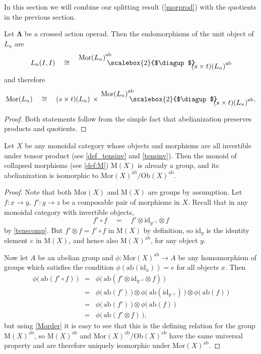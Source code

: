 \documentclass{amsbook} %
\newcommand{\id}{\textrm{id}}
\newcommand{\ML}{\mathbf{\Lambda}}
\newcommand{\MorLn}{\mathrm{Mor}(L_n)}
\newcommand{\bigquotient}[2]{ \raisebox{0.75\height}{$#1$} \mkern-12mu\scalebox{2}{$\diagup$}\mkern-10mu \raisebox{-0.5\height}{$#2$} }
\numberwithin{section}{chapter}
\begin{document}
In this section we will combine our splitting result (\cref{morprod}) with the quotients in the previous section.

\begin{cor}\label{Zmor1} Let $\ML$ be a crossed action operad. Then the endomorphisms of the unit object of $L_n$ are
\[ L_n(I, I) \quad \cong \quad \bigquotient{{\MorLn}^{\mathrm{ab}}}{{(s \times t)(L_n)}^{\mathrm{ab}}} \]
and therefore
\[ \MorLn \quad \cong \quad (s \times t)(L_n) \, \times \, \bigquotient{{\MorLn}^{\mathrm{ab}}}{{(s \times t)(L_n)}^{\mathrm{ab}}}. \]
\end{cor}
\begin{proof}
Both statements follow from the simple fact that abelianization preserves products and quotients.
\end{proof}

\begin{lem} \label{colquot} Let $X$ be any monoidal category whose objects and morphisms are all invertible under tensor product (see \cref{def_tensinv} and \cref{tensinv}). Then the monoid of collapsed morphisms (see \cref{def:M}) $\mathrm{M}(X)$ is already a group, and its abelianization is isomorphic to $\mathrm{Mor}(X)^{\mathrm{ab}}/ \mathrm{Ob}(X)^{\mathrm{ab}}$.
\end{lem}
\begin{proof}
Note that both $\mathrm{Mor}(X)$ and $\mathrm{M}(X)$ are groups by assumption. Let  $f \colon  x \to y$, $f' \colon  y \to z$ be a composable pair of morphisms in $X$. Recall  that in any monoidal category with invertible objects,
\[ f' \circ f \quad = \quad f' \otimes \id_{y^{-1}} \otimes f \]
by \cref{tenscomp}.  But $f' \otimes f = f' \circ f$ in $\mathrm{M}(X)$ by definition, so $\id_y$ is the identity element $e$ in $\mathrm{M}(X)$, and hence also $\mathrm{M}(X)^{\mathrm{ab}}$, for any object $y$.

Now let $A$ be an abelian group and $\phi \colon  \mathrm{Mor}(X)^{\mathrm{ab}} \to A$ be any homomorphism of groups which satisfies the condition $\phi(\mathrm{ab}(\id_x)) = e$ for all objects $x$. Then
\[ \begin{array}{rll}
			\phi\big( \, \mathrm{ab}(f' \circ f) \, \big)  & = & \phi\big( \, \mathrm{ab}(f' \otimes \id_{y^{-1}} \otimes f) \, \big) \\
			& = & \phi\big( \, \mathrm{ab}(f') \, \big) \otimes \phi\big( \, \mathrm{ab}(\id_{y^{-1}}) \, \big) \otimes \phi\big( \, \mathrm{ab}(f) \, \big) \\
			& = & \phi\big( \, \mathrm{ab}(f') \, \big) \otimes \phi\big( \, \mathrm{ab}(f) \, \big) \\
			& = & \phi\big( \, \mathrm{ab}(f' \otimes f) \, \big),
		\end{array}
\]
but using \cref{Morder} it is easy to see that this is the defining relation for the group $\mathrm{M}(X)^{\mathrm{ab}}$, so $\mathrm{M}(X)^{\mathrm{ab}}$ and $\mathrm{Mor}(X)^{\mathrm{ab}}/\mathrm{Ob}(X)^{\mathrm{ab}}$ have the same universal property and are therefore uniquely isomorphic under $\mathrm{Mor}(X)^{\mathrm{ab}}$.
\end{proof}
\end{document}
